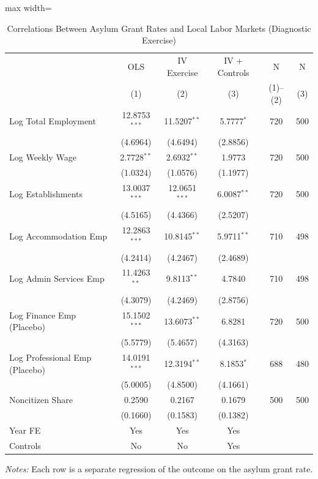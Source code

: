 \begin{table}[htbp]
\centering
\caption{Correlations Between Asylum Grant Rates and Local Labor Markets (Diagnostic Exercise)}
\label{tab:main_results}
\begin{adjustbox}{max width=\textwidth}
\begin{tabular}{lccccc}
\toprule
 & OLS & IV Exercise & IV + Controls & N & N \\
 & (1) & (2) & (3) & (1)--(2) & (3) \\
\midrule
Log Total Employment & 12.8753$^{***}$ & 11.5207$^{**}$ & 5.7777$^{*}$ & 720 & 500 \\
 & (4.6964) & (4.6494) & (2.8856) & & \\[4pt]
Log Weekly Wage & 2.7728$^{**}$ & 2.6932$^{**}$ & 1.9773 & 720 & 500 \\
 & (1.0324) & (1.0576) & (1.1977) & & \\[4pt]
Log Establishments & 13.0037$^{***}$ & 12.0651$^{***}$ & 6.0087$^{**}$ & 720 & 500 \\
 & (4.5165) & (4.4366) & (2.5207) & & \\[4pt]
Log Accommodation Emp & 12.2863$^{***}$ & 10.8145$^{**}$ & 5.9711$^{**}$ & 710 & 498 \\
 & (4.2414) & (4.2467) & (2.4689) & & \\[4pt]
Log Admin Services Emp & 11.4263$^{**}$ & 9.8113$^{**}$ & 4.7840 & 710 & 498 \\
 & (4.3079) & (4.2469) & (2.8756) & & \\[4pt]
Log Finance Emp (Placebo) & 15.1502$^{***}$ & 13.6073$^{**}$ & 6.8281 & 720 & 500 \\
 & (5.5779) & (5.4657) & (4.3163) & & \\[4pt]
Log Professional Emp (Placebo) & 14.0191$^{***}$ & 12.3194$^{**}$ & 8.1853$^{*}$ & 688 & 480 \\
 & (5.0005) & (4.8500) & (4.1661) & & \\[4pt]
Noncitizen Share & 0.2590 & 0.2167 & 0.1679 & 500 & 500 \\
 & (0.1660) & (0.1583) & (0.1382) & & \\[4pt]
\midrule
Year FE & Yes & Yes & Yes & & \\
Controls & No & No & Yes & & \\
\bottomrule
\end{tabular}
\end{adjustbox}
\begin{minipage}{0.9\textwidth}
\vspace{0.5em}
\footnotesize \textit{Notes:} Each row is a separate regression of the outcome on the asylum grant rate.

\end{minipage}
\end{table}
